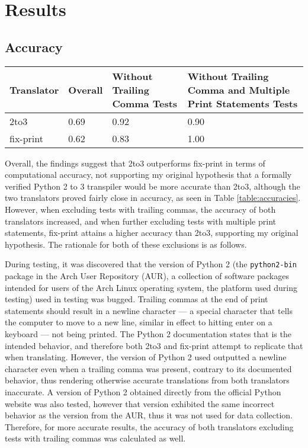 \section{Results}

\subsection{Accuracy}
\begin{table*}[ht!]
    \centering
    \begin{tabular}{@{}l|lll@{}}
    \toprule
    Translator & Overall & Without Trailing Comma Tests & Without Trailing Comma and Multiple Print Statements Tests \\ \midrule
    2to3       & 0.69                         & 0.92                                      & 0.90                                                                             \\
    fix-print & 0.62                          & 0.83                                      & 1.00                                                                               \\ \bottomrule
    \end{tabular}
    \caption{Computational accuracy of 2to3 and fix-print.}
    \label{table:accuracies}
\end{table*}

Overall, the findings suggest that 2to3 outperforms fix-print in terms of computational accuracy, not supporting my original hypothesis that a formally verified Python 2 to 3 transpiler would be more accurate than 2to3, although the two translators proved fairly close in accuracy, as seen in Table \ref{table:accuracies}. However, when excluding tests with trailing commas, the accuracy of both translators increased, and when further excluding tests with multiple print statements, fix-print attains a higher accuracy than 2to3, supporting my original hypothesis. The rationale for both of these exclusions is as follows.

During testing, it was discovered that the version of Python 2 (the \verb|python2-bin| package in the Arch User Repository (AUR), a collection of software packages intended for users of the Arch Linux operating system, the platform used during testing) used in testing was bugged. Trailing commas at the end of print statements should result in a newline character --- a special character that tells the computer to move to a new line, similar in effect to hitting enter on a keyboard --- not being printed. The Python 2 documentation states that is the intended behavior, and therefore both 2to3 and fix-print attempt to replicate that when translating. However, the version of Python 2 used outputted a newline character even when a trailing comma was present, contrary to its documented behavior, thus rendering otherwise accurate translations from both translators inaccurate. A version of Python 2 obtained directly from the official Python website was also tested, however that version exhibited the same incorrect behavior as the version from the AUR, thus it was not used for data collection. Therefore, for more accurate results, the accuracy of both translators excluding tests with trailing commas was calculated as well.

